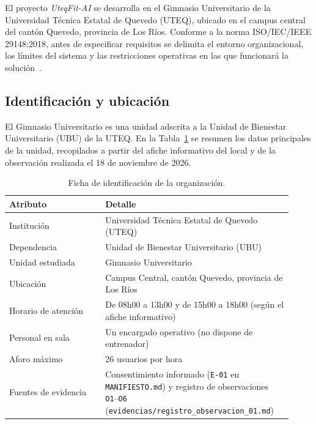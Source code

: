 El proyecto \textit{UteqFit-AI} se desarrolla en el Gimnasio Universitario de la Universidad Técnica Estatal de Quevedo (UTEQ), ubicado en el campus central del cantón Quevedo, provincia de Los Ríos. Conforme a la norma ISO/IEC/IEEE 29148:2018, antes de especificar requisitos se delimita el entorno organizacional, los límites del sistema y las restricciones operativas en las que funcionará la solución~\cite{iso29148}.

\subsection{Identificación y ubicación}

El Gimnasio Universitario es una unidad adscrita a la Unidad de Bienestar Universitario (UBU) de la UTEQ. En la Tabla~\ref{tab:ficha_organizacion} se resumen los datos principales de la unidad, recopilados a partir del afiche informativo del local y de la observación realizada el 18 de noviembre de 2026.

\begin{table}[htbp]
    \centering
    \caption{Ficha de identificación de la organización.}
    \label{tab:ficha_organizacion}
    \begin{tabular}{p{0.32\linewidth} p{0.60\linewidth}}
        \hline
        \textbf{Atributo} & \textbf{Detalle} \\
        \hline
        Institución & Universidad Técnica Estatal de Quevedo (UTEQ) \\
        Dependencia & Unidad de Bienestar Universitario (UBU) \\
        Unidad estudiada & Gimnasio Universitario \\
        Ubicación & Campus Central, cantón Quevedo, provincia de Los Ríos \\
        Horario de atención & De 08h00 a 13h00 y de 15h00 a 18h00 (según el afiche informativo) \\
        Personal en sala & Un encargado operativo (no dispone de entrenador) \\
        Aforo máximo & 26 usuarios por hora \\
        Fuentes de evidencia & Consentimiento informado (\texttt{E-01} en \texttt{MANIFIESTO.md}) y registro de observaciones \texttt{O1}--\texttt{O6} (\texttt{evidencias/registro\_observacion\_01.md}) \\
        \hline
    \end{tabular}
\end{table}

